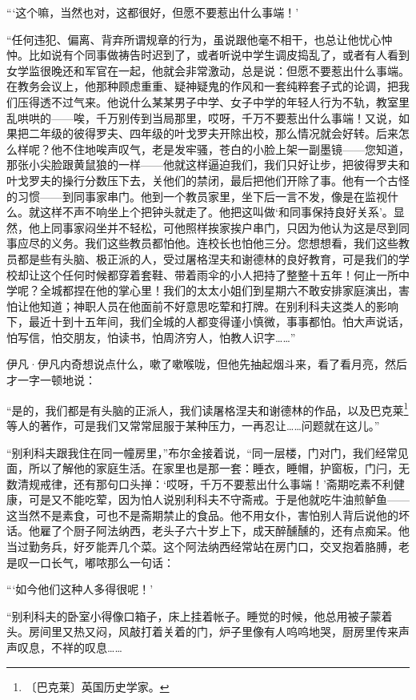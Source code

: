\documentclass[12pt,UTF-8,openany]{ctexbook}
\begin{document}
\begin{large}
    “‘这个嘛，当然也对，这都很好，但愿不要惹出什么事端！’
    
    “任何违犯、偏离、背弃所谓规章的行为，虽说跟他毫不相干，也总让他忧心忡忡。比如说有个同事做祷告时迟到了，或者听说中学生调皮捣乱了，或者有人看到女学监很晚还和军官在一起，他就会非常激动，总是说：但愿不要惹出什么事端。在教务会议上，他那种顾虑重重、疑神疑鬼的作风和一套纯粹套子式的论调，把我们压得透不过气来。他说什么某某男子中学、女子中学的年轻人行为不轨，教室里乱哄哄的——唉，千万别传到当局那里，哎呀，千万不要惹出什么事端！又说，如果把二年级的彼得罗夫、四年级的叶戈罗夫开除出校，那么情况就会好转。后来怎么样呢？他不住地唉声叹气，老是发牢骚，苍白的小脸上架一副墨镜——您知道，那张小尖脸跟黄鼠狼的一样——他就这样逼迫我们，我们只好让步，把彼得罗夫和叶戈罗夫的操行分数压下去，关他们的禁闭，最后把他们开除了事。他有一个古怪的习惯——到同事家串门。他到一个教员家里，坐下后一言不发，像是在监视什么。就这样不声不响坐上个把钟头就走了。他把这叫做‘和同事保持良好关系’。显然，他上同事家闷坐并不轻松，可他照样挨家挨户串门，只因为他认为这是尽到同事应尽的义务。我们这些教员都怕他。连校长也怕他三分。您想想看，我们这些教员都是些有头脑、极正派的人，受过屠格涅夫和谢德林的良好教育，可是我们的学校却让这个任何时候都穿着套鞋、带着雨伞的小人把持了整整十五年！何止一所中学呢？全城都捏在他的掌心里！我们的太太小姐们到星期六不敢安排家庭演出，害怕让他知道；神职人员在他面前不好意思吃荤和打牌。在别利科夫这类人的影响下，最近十到十五年间，我们全城的人都变得谨小慎微，事事都怕。怕大声说话，怕写信，怕交朋友，怕读书，怕周济穷人，怕教人识字……”
    
    伊凡·伊凡内奇想说点什么，嗽了嗽喉咙，但他先抽起烟斗来，看了看月亮，然后才一字一顿地说：
    
    “是的，我们都是有头脑的正派人，我们读屠格涅夫和谢德林的作品，以及巴克莱\footnote{〔巴克莱〕英国历史学家。}等人的著作，可是我们又常常屈服于某种压力，一再忍让……问题就在这儿。”
    
    “别利科夫跟我住在同一幢房里，”布尔金接着说，“同一层楼，门对门，我们经常见面，所以了解他的家庭生活。在家里也是那一套：睡衣，睡帽，护窗板，门闩，无数清规戒律，还有那句口头掸：‘哎呀，千万不要惹出什么事端！’斋期吃素不利健康，可是又不能吃荤，因为怕人说别利科夫不守斋戒。于是他就吃牛油煎鲈鱼——这当然不是素食，可也不是斋期禁止的食品。他不用女仆，害怕别人背后说他的坏话。他雇了个厨子阿法纳西，老头子六十岁上下，成天醉醺醺的，还有点痴呆。他当过勤务兵，好歹能弄几个菜。这个阿法纳西经常站在房门口，交叉抱着胳膊，老是叹一口长气，嘟哝那么一句话：
    
    “‘如今他们这种人多得很呢！’
    
    “别利科夫的卧室小得像口箱子，床上挂着帐子。睡觉的时候，他总用被子蒙着头。房间里又热又闷，风敲打着关着的门，炉子里像有人呜呜地哭，厨房里传来声声叹息，不祥的叹息……
    

\end{large}
\end{document}
